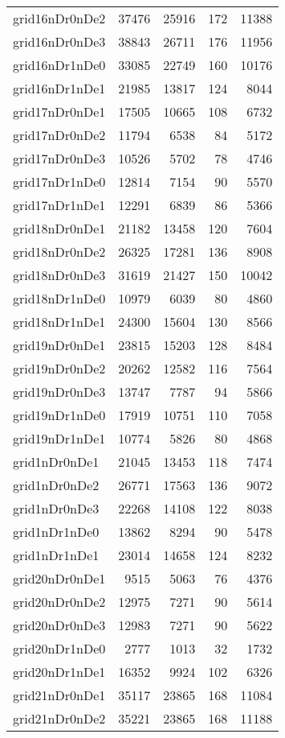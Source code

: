 \begin{longtable}{lrrrr}
grid16nDr0nDe2 & 37476 & 25916 & 172 & 11388 \\
grid16nDr0nDe3 & 38843 & 26711 & 176 & 11956 \\
grid16nDr1nDe0 & 33085 & 22749 & 160 & 10176 \\
grid16nDr1nDe1 & 21985 & 13817 & 124 & 8044 \\
grid17nDr0nDe1 & 17505 & 10665 & 108 & 6732 \\
grid17nDr0nDe2 & 11794 & 6538 & 84 & 5172 \\
grid17nDr0nDe3 & 10526 & 5702 & 78 & 4746 \\
grid17nDr1nDe0 & 12814 & 7154 & 90 & 5570 \\
grid17nDr1nDe1 & 12291 & 6839 & 86 & 5366 \\
grid18nDr0nDe1 & 21182 & 13458 & 120 & 7604 \\
grid18nDr0nDe2 & 26325 & 17281 & 136 & 8908 \\
grid18nDr0nDe3 & 31619 & 21427 & 150 & 10042 \\
grid18nDr1nDe0 & 10979 & 6039 & 80 & 4860 \\
grid18nDr1nDe1 & 24300 & 15604 & 130 & 8566 \\
grid19nDr0nDe1 & 23815 & 15203 & 128 & 8484 \\
grid19nDr0nDe2 & 20262 & 12582 & 116 & 7564 \\
grid19nDr0nDe3 & 13747 & 7787 & 94 & 5866 \\
grid19nDr1nDe0 & 17919 & 10751 & 110 & 7058 \\
grid19nDr1nDe1 & 10774 & 5826 & 80 & 4868 \\
grid1nDr0nDe1 & 21045 & 13453 & 118 & 7474 \\
grid1nDr0nDe2 & 26771 & 17563 & 136 & 9072 \\
grid1nDr0nDe3 & 22268 & 14108 & 122 & 8038 \\
grid1nDr1nDe0 & 13862 & 8294 & 90 & 5478 \\
grid1nDr1nDe1 & 23014 & 14658 & 124 & 8232 \\
grid20nDr0nDe1 & 9515 & 5063 & 76 & 4376 \\
grid20nDr0nDe2 & 12975 & 7271 & 90 & 5614 \\
grid20nDr0nDe3 & 12983 & 7271 & 90 & 5622 \\
grid20nDr1nDe0 & 2777 & 1013 & 32 & 1732 \\
grid20nDr1nDe1 & 16352 & 9924 & 102 & 6326 \\
grid21nDr0nDe1 & 35117 & 23865 & 168 & 11084 \\
grid21nDr0nDe2 & 35221 & 23865 & 168 & 11188 \\

\end{longtable}
